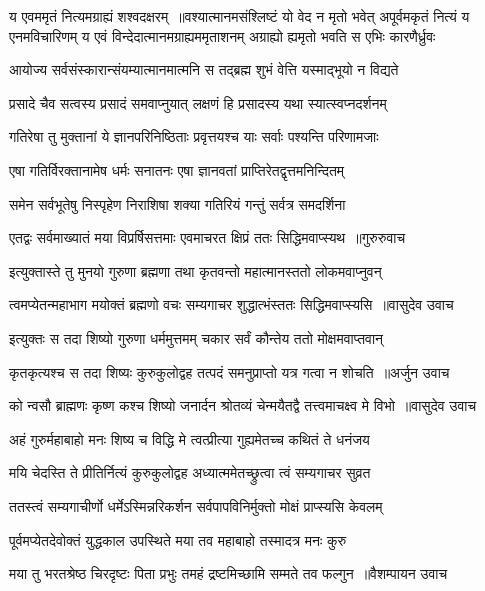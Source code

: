 य एवममृतं नित्यमग्राह्यं शश्वदक्षरम् ॥वश्यात्मानमसंश्लिष्टं यो वेद न मृतो भवेत्
\threelineshloka
{अपूर्वमकृतं नित्यं य एनमविचारिणम्}
{य एवं विन्देदात्मानमग्राह्यममृताशनम्}
{अग्राह्यो ह्यमृतो भवति स एभिः कारणैर्ध्रुवः}


\twolineshloka
{आयोज्य सर्वसंस्कारान्संयम्यात्मानमात्मनि}
{स तद्ब्रह्म शुभं वेत्ति यस्माद्भूयो न विद्यते}


\twolineshloka
{प्रसादे चैव सत्वस्य प्रसादं समवाप्नुयात्}
{लक्षणं हि प्रसादस्य यथा स्यात्स्वप्नदर्शनम्}


\twolineshloka
{गतिरेषा तु मुक्तानां ये ज्ञानपरिनिष्ठिताः}
{प्रवृत्तयश्च याः सर्वाः पश्यन्ति परिणामजाः}


\twolineshloka
{एषा गतिर्विरक्तानामेष धर्मः सनातनः}
{एषा ज्ञानवतां प्राप्तिरेतद्वृत्तमनिन्दितम्}


\twolineshloka
{समेन सर्वभूतेषु निस्पृहेण निराशिषा}
{शक्या गतिरियं गन्तुं सर्वत्र समदर्शिना}


\threelineshloka
{एतद्वः सर्वमाख्यातं मया विप्रर्षिसत्तमाः}
{एवमाचरत क्षिप्रं ततः सिद्धिमवाप्स्यथ ॥गुरुरुवाच}
{}


\twolineshloka
{इत्युक्तास्ते तु मुनयो गुरुणा ब्रह्मणा तथा}
{कृतवन्तो महात्मानस्ततो लोकमवाप्नुवन्}


\threelineshloka
{त्वमप्येतन्महाभाग मयोक्तं ब्रह्मणो वचः}
{सम्यगाचर शुद्धात्भंस्ततः सिद्धिमवाप्स्यसि ॥वासुदेव उवाच}
{}


\twolineshloka
{इत्युक्तः स तदा शिष्यो गुरुणा धर्ममुत्तमम्}
{चकार सर्वं कौन्तेय ततो मोक्षमवाप्तवान्}


\threelineshloka
{कृतकृत्यश्च स तदा शिष्यः कुरुकुलोद्वह}
{तत्पदं समनुप्राप्तो यत्र गत्वा न शोचति ॥अर्जुन उवाच}
{}


\threelineshloka
{को न्वसौ ब्राह्मणः कृष्ण कश्च शिष्यो जनार्दन}
{श्रोतव्यं चेन्मयैतद्वै तत्त्वमाचक्ष्व मे विभो ॥वासुदेव उवाच}
{}


\twolineshloka
{अहं गुरुर्महाबाहो मनः शिष्य च विद्धि मे}
{त्वत्प्रीत्या गुह्यमेतच्च कथितं ते धनंजय}


\twolineshloka
{मयि चेदस्ति ते प्रीतिर्नित्यं कुरुकुलोद्वह}
{अध्यात्ममेतच्छ्रुत्वा त्वं सम्यगाचर सुव्रत}


\twolineshloka
{ततस्त्वं सम्यगाचीर्णो धर्मेऽस्मिन्नरिकर्शन}
{सर्वपापविनिर्मुक्तो मोक्षं प्राप्स्यसि केवलम्}


\twolineshloka
{पूर्वमप्येतदेवोक्तं युद्धकाल उपस्थिते}
{मया तव महाबाहो तस्मादत्र मनः कुरु}


\threelineshloka
{मया तु भरतश्रेष्ठ चिरदृष्टः पिता प्रभुः}
{तमहं द्रष्टमिच्छामि सम्मते तव फल्गुन ॥वैशम्पायन उवाच}
{}


